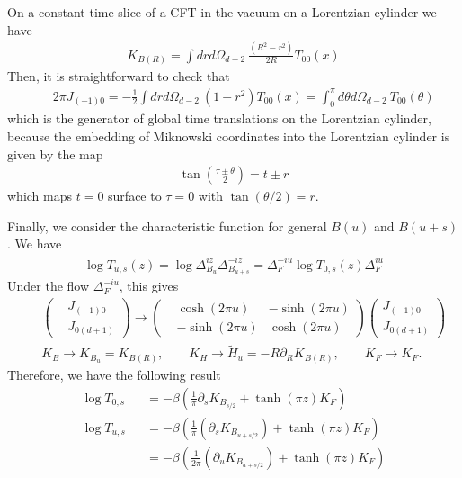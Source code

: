 \documentclass[a4paper,11pt]{article}
\theoremstyle{definition}
\newcommand{\nn}{\nonumber}
\newcommand{\lb}{\left(}
\newcommand{\rb}{\right)}
\newcommand{\p}{\partial}
\begin{document}
On a constant time-slice of a CFT in the vacuum on a Lorentzian cylinder we have
\begin{eqnarray}
    K_{B(R)}=\int dr d\Omega_{d-2}\: \frac{(R^2-r^2)}{2R}T_{00}(x)
\end{eqnarray}
Then, it is straightforward to check that 
\begin{eqnarray}
&&2\pi J_{(-1)0}=-\frac{1}{2}\int dr d\Omega_{d-2}\:(1+r^2) T_{00}(x)=\int_{0}^\pi d\theta d\Omega_{d-2}\: T_{00}(\theta)
\end{eqnarray}
which is the generator of global time translations on the Lorentzian cylinder, because the embedding of Miknowski coordinates into the Lorentzian cylinder is given by the map
\begin{eqnarray}
    \tan\lb\frac{\tau\pm \theta}{2}\rb=t\pm r
\end{eqnarray}
which maps $t=0$ surface to $\tau=0$ with $\tan(\theta/2)=r$.

Finally, we consider the characteristic function for general $B(u)$ and $B(u+s)$. We have
\begin{eqnarray}
   \log T_{u,s}(z)=\log\Delta_{B_u}^{iz}\Delta_{B_{u+s}}^{-iz}=\Delta_F^{-iu} \log T_{0,s}(z) \Delta_F^{iu} 
\end{eqnarray}
Under the flow $\Delta_F^{-iu}$, this gives
\begin{eqnarray}
 &&\begin{pmatrix}
        & J_{(-1)0} \\
        & J_{0(d+1)}
    \end{pmatrix}
    \to \begin{pmatrix}
        &\cosh(2\pi u) & -\sinh(2\pi u)  \\
         & -\sinh(2\pi u)& \cosh(2\pi u)
    \end{pmatrix}
    \begin{pmatrix}
        J_{(-1)0}\\
        J_{0(d+1)}
    \end{pmatrix}\nn\\
    &&K_B\to  K_{B_u}=K_{B(R)}, \qquad K_H\to \tilde{H}_{u} =-R\p_R K_{B(R)}, \qquad K_F\to K_F.
\end{eqnarray}
Therefore, we have the following result
\begin{eqnarray}
    \log T_{0,s}&&=-\beta \lb\frac{1}{\pi}\p_sK_{B_{s/2}} +\tanh(\pi z)K_F\rb\nn\\
    \log T_{u,s}&&=-\beta \lb \frac{1}{\pi}(\p_s K_{B_{u+s/2}})+\tanh(\pi z)K_F\rb \nn\\
    &&= -\beta \lb \frac{1}{2\pi}(\p_u K_{B_{u+s/2}})+\tanh(\pi z)K_F\rb
\end{eqnarray}
\end{document}
